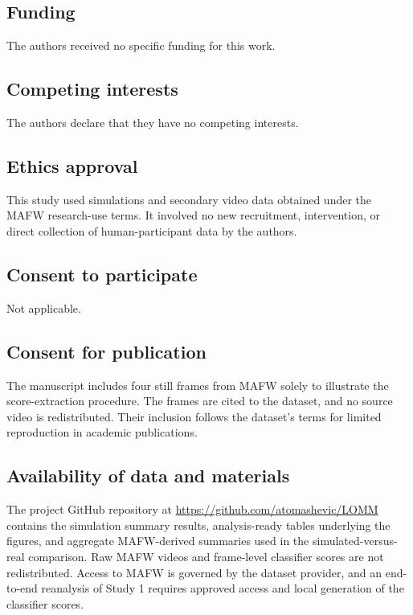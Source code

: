 \documentclass[
]{article}
\begin{document}
\subsection{Funding}\label{funding}

The authors received no specific funding for this work.

\subsection{Competing interests}\label{competing-interests}

The authors declare that they have no competing interests.

\subsection{Ethics approval}\label{ethics-approval}

This study used simulations and secondary video data obtained under the
MAFW research-use terms. It involved no new recruitment, intervention,
or direct collection of human-participant data by the authors.

\subsection{Consent to participate}\label{consent-to-participate}

Not applicable.

\subsection{Consent for publication}\label{consent-for-publication}

The manuscript includes four still frames from MAFW solely to illustrate
the score-extraction procedure. The frames are cited to the dataset, and
no source video is redistributed. Their inclusion follows the dataset's
terms for limited reproduction in academic publications.

\subsection{Availability of data and
materials}\label{availability-of-data-and-materials}

The project GitHub repository at
\url{https://github.com/atomashevic/LOMM} contains the simulation
summary results, analysis-ready tables underlying the figures, and
aggregate MAFW-derived summaries used in the simulated-versus-real
comparison. Raw MAFW videos and frame-level classifier scores are not
redistributed. Access to MAFW is governed by the dataset provider, and
an end-to-end reanalysis of Study 1 requires approved access and local
generation of the classifier scores.
\end{document}
